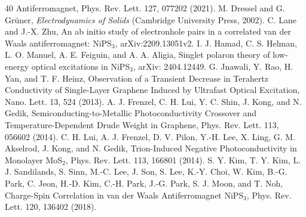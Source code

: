 \documentclass[
 reprint,
superscriptaddress,

 amsmath,amssymb,
 aps,

]{revtex4-2}
\begin{document}
\begin{thebibliography}{40}
Antiferromagnet, Phys. Rev. Lett. 127, 077202 (2021).
M. Dressel and G. Gr\"{u}ner, \textit{Electrodynamics of Solids}
(Cambridge University Press, 2002).
C. Lane and J.-X. Zhu, An ab initio study of electronhole
pairs in a correlated van der Waals antiferromagnet:
NiPS$_3$, arXiv:2209.13051v2.
I. J. Hamad, C. S. Helman, L. O. Manuel, A. E. Feiguin,
and A. A. Aligia, Singlet polaron theory of low-energy
optical excitations in NiPS$_3$, arXiv: 2404.12449.
G. Jnawali, Y. Rao, H. Yan, and T. F. Heinz, Observation
of a Transient Decrease in Terahertz Conductivity
of Single-Layer Graphene Induced by Ultrafast Optical
Excitation, Nano. Lett. 13, 524 (2013).
A. J. Frenzel, C. H. Lui, Y. C. Shin, J. Kong, and
N. Gedik, Semiconducting-to-Metallic Photoconductivity
Crossover and Temperature-Dependent Drude Weight in
Graphene, Phys. Rev. Lett. 113, 056602 (2014).
C. H. Lui, A. J. Frenzel, D. V. Pilon, Y.-H. Lee, X. Ling,
G. M. Akselrod, J. Kong, and N. Gedik, Trion-Induced
Negative Photoconductivity in Monolayer MoS$_2$, Phys.
Rev. Lett. 113, 166801 (2014).
S. Y. Kim, T. Y. Kim, L. J. Sandilands, S. Sinn, M.-C.
Lee, J. Son, S. Lee, K.-Y. Choi, W. Kim, B.-G. Park,
C. Jeon, H.-D. Kim, C.-H. Park, J.-G. Park, S. J. Moon,
and T. Noh, Charge-Spin Correlation in van der Waals
Antiferromagnet NiPS$_3$, Phys. Rev. Lett. 120, 136402
(2018).
\end{thebibliography}
\end{document}
